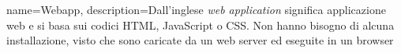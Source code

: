 {
	name={Webapp},
	description={Dall'inglese \textit{web application} significa applicazione web e si basa sui codici HTML, JavaScript o CSS. Non hanno bisogno di alcuna installazione, visto che sono caricate da un web server ed eseguite in un browser}
}
